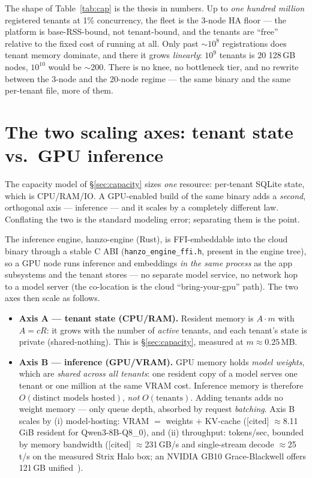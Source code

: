 \documentclass[11pt]{article}
\newcommand{\cited}{\textcolor{purple!70!black}{\small[cited]}}
\begin{document}
The shape of Table~\ref{tab:cap} is the thesis in numbers. Up to \emph{one hundred million}
registered tenants at 1\% concurrency, the fleet is the 3-node HA floor --- the platform is
base-RSS-bound, not tenant-bound, and the tenants are ``free'' relative to the fixed cost of
running at all. Only past $\sim$$10^8$ registrations does tenant memory dominate, and there it
grows \emph{linearly}: $10^9$ tenants is 20 128\,GB nodes, $10^{10}$ would be $\sim$200. There is
no knee, no bottleneck tier, and no rewrite between the 3-node and the 20-node regime --- the
same binary and the same per-tenant file, more of them.

\section{The two scaling axes: tenant state vs.\ GPU inference}
\label{sec:axes}
The capacity model of \S\ref{sec:capacity} sizes \emph{one} resource: per-tenant SQLite state,
which is CPU/RAM/IO. A GPU-enabled build of the same binary adds a \emph{second}, orthogonal
axis --- inference --- and it scales by a completely different law. Conflating the two is the
standard modeling error; separating them is the point.

The inference engine, hanzo-engine (Rust), is FFI-embeddable into the cloud binary through a
stable C ABI (\texttt{hanzo\_engine\_ffi.h}, present in the engine tree), so a GPU node runs
inference and embeddings \emph{in the same process} as the app subsystems and the tenant stores
--- no separate model service, no network hop to a model server (the co-location is the cloud
``bring-your-gpu'' path). The two axes then scale as follows.

\begin{itemize}[leftmargin=1.4em]
\item \textbf{Axis A --- tenant state (CPU/RAM).} Resident memory is $A\cdot m$ with $A=cR$: it
grows with the number of \emph{active} tenants, and each tenant's state is private
(shared-nothing). This is \S\ref{sec:capacity}, measured at $m\approx0.25$\,MB.
\item \textbf{Axis B --- inference (GPU/VRAM).} GPU memory holds \emph{model weights}, which are
\emph{shared across all tenants}: one resident copy of a model serves one tenant or one million
at the same VRAM cost. Inference memory is therefore $O(\text{distinct models hosted})$, \emph{not}
$O(\text{tenants})$. Adding tenants adds no weight memory --- only queue depth, absorbed by request
\emph{batching}. Axis B scales by (i) model-hosting: VRAM $=$ weights $+$ KV-cache
(\cited{} $\approx$8.11\,GiB resident for Qwen3-8B-Q8\_0), and (ii) throughput: tokens/sec, bounded
by memory bandwidth (\cited{} $\approx$231\,GB/s and single-stream decode $\approx$25\,t/s on the
measured Strix Halo box; an NVIDIA GB10 Grace-Blackwell offers 121\,GB unified~\cite{xbench}).
\end{itemize}
\end{document}

